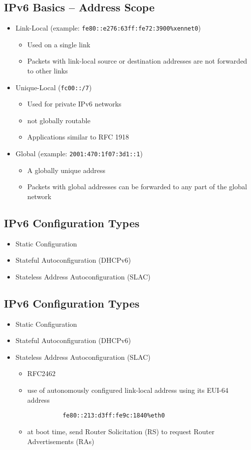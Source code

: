 \documentclass[xga]{xdvislides}
\begin{document}
\subsection{IPv6 Basics -- Address Scope}
\begin{itemize}
	\item Link-Local (example: \verb+fe80::e276:63ff:fe72:3900%xennet0+)
		\begin{itemize}
			\item Used on a single link
			\item Packets with link-local source or destination addresses are not
				forwarded to other links
		\end{itemize}
	\item Unique-Local (\verb+fc00::/7+)
		\begin{itemize}
			\item Used for private IPv6 networks
			\item not globally routable
			\item Applications similar to RFC 1918
		\end{itemize}
	\item Global (example: \verb+2001:470:1f07:3d1::1+)
		\begin{itemize}
			\item A globally unique address
			\item Packets with global addresses can be forwarded to any part of
				the global network
		\end{itemize}
\end{itemize}

\subsection{IPv6 Configuration Types}
\begin{itemize}
	\item Static Configuration
	\item Stateful Autoconfiguration (DHCPv6)
	\item Stateless Address Autoconfiguration (SLAC)
\end{itemize}

\subsection{IPv6 Configuration Types}
\begin{itemize}
	\item Static Configuration
	\item Stateful Autoconfiguration (DHCPv6)
	\item Stateless Address Autoconfiguration (SLAC)
	\begin{itemize}
		\item RFC2462
		\item use of autonomously configured link-local address
			using its EUI-64 address
\begin{verbatim}
          fe80::213:d3ff:fe9c:1840%eth0
\end{verbatim}
		\item at boot time, send Router Solicitation (RS) to
			request Router Advertisements (RAs)
	\end{itemize}
\end{itemize}
\end{document}
